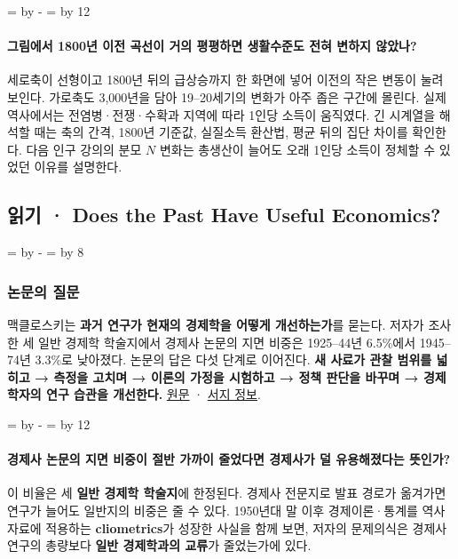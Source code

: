 \documentclass[10pt,a4paper]{article}
\newcommand{\ReserveQuestionSpace}{%
  \par\begingroup
  \dimen0=\pagegoal \advance\dimen0 by -\pagetotal
  \dimen2=\baselineskip \multiply\dimen2 by 12
  \ifdim\dimen0<\dimen2 \newpage\fi
  \endgroup}
\newcommand{\ReserveReadingSectionSpace}{%
  \par\begingroup
  \dimen0=\pagegoal \advance\dimen0 by -\pagetotal
  \dimen2=\baselineskip \multiply\dimen2 by 8
  \ifdim\dimen0<\dimen2 \newpage\fi
  \endgroup}
\begin{document}
\ReserveQuestionSpace
\paragraph{그림에서 1800년 이전 곡선이 거의 평평하면 생활수준도 전혀 변하지 않았나?}
세로축이 선형이고 1800년 뒤의 급상승까지 한 화면에 넣어 이전의 작은 변동이 눌려 보인다. 가로축도 3,000년을 담아 19–20세기의 변화가 아주 좁은 구간에 몰린다. 실제 역사에서는 전염병·전쟁·수확과 지역에 따라 1인당 소득이 움직였다. 긴 시계열을 해석할 때는 축의 간격, 1800년 기준값, 실질소득 환산법, 평균 뒤의 집단 차이를 확인한다. 다음 인구 강의의 분모 $N$ 변화는 총생산이 늘어도 오래 1인당 소득이 정체할 수 있었던 이유를 설명한다.\par

\clearpage{}
{}
\subsection*{읽기 · Does the Past Have Useful Economics?}
\ReserveReadingSectionSpace
\subsubsection*{논문의 질문}

맥클로스키는 \textbf{과거 연구가 현재의 경제학을 어떻게 개선하는가}를 묻는다. 저자가 조사한 세 일반 경제학 학술지에서 경제사 논문의 지면 비중은 1925–44년 6.5\%에서 1945–74년 3.3\%로 낮아졌다. 논문의 답은 다섯 단계로 이어진다. \textbf{새 사료가 관찰 범위를 넓히고 → 측정을 고치며 → 이론의 가정을 시험하고 → 정책 판단을 바꾸며 → 경제학자의 연구 습관을 개선한다.} \href{https://www.deirdremccloskey.com/docs/pdf/Article\_92.pdf}{원문} · \href{https://ideas.repec.org/a/aea/jeclit/v14y1976i2p434-61.html}{서지 정보}.\par

\ReserveQuestionSpace
\paragraph{경제사 논문의 지면 비중이 절반 가까이 줄었다면 경제사가 덜 유용해졌다는 뜻인가?}
이 비율은 세 \textbf{일반 경제학 학술지}에 한정된다. 경제사 전문지로 발표 경로가 옮겨가면 연구가 늘어도 일반지의 비중은 줄 수 있다. 1950년대 말 이후 경제이론·통계를 역사 자료에 적용하는 \textbf{cliometrics}가 성장한 사실을 함께 보면, 저자의 문제의식은 경제사 연구의 총량보다 \textbf{일반 경제학과의 교류}가 줄었는가에 있다.\par
\end{document}
